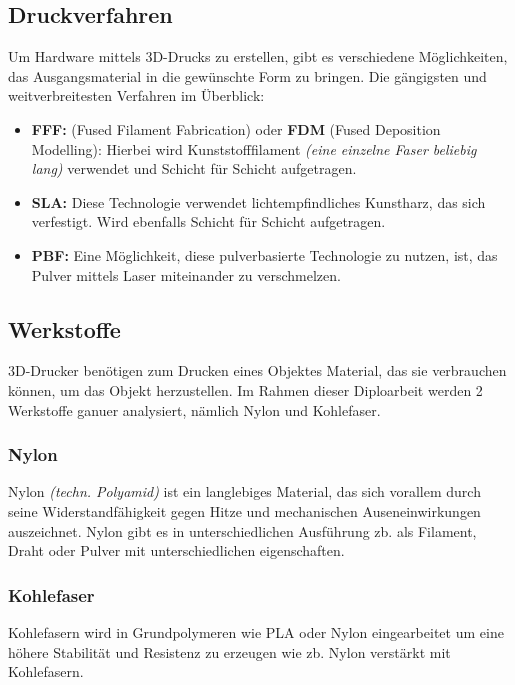 \subsection{Druckverfahren}

Um Hardware mittels 3D-Drucks zu erstellen, gibt es verschiedene Möglichkeiten, das Ausgangsmaterial in die gewünschte Form zu bringen. Die gängigsten und weitverbreitesten Verfahren im Überblick: 

\begin{itemize}
	\item \textbf{FFF:} (Fused Filament Fabrication) oder \textbf{FDM} (Fused Deposition Modelling): Hierbei wird Kunststofffilament \emph{(eine einzelne Faser beliebig lang)} verwendet und Schicht für Schicht aufgetragen.
	\item \textbf{SLA:} Diese Technologie verwendet lichtempfindliches Kunstharz, das sich verfestigt. Wird ebenfalls Schicht für Schicht aufgetragen.
	\item \textbf{PBF:} Eine Möglichkeit, diese pulverbasierte Technologie zu nutzen, ist, das Pulver mittels Laser miteinander zu verschmelzen. \cite{kaffka} \cite{3ds}
\end{itemize}

\subsection{Werkstoffe}
3D-Drucker benötigen zum Drucken eines Objektes Material, das sie verbrauchen können, um das Objekt herzustellen. Im Rahmen dieser Diploarbeit werden 2 Werkstoffe ganuer analysiert, nämlich Nylon und Kohlefaser.

\subsubsection{Nylon}
Nylon \emph{(techn. Polyamid)} ist ein langlebiges Material, das sich vorallem durch seine Widerstandfähigkeit gegen Hitze und mechanischen Auseneinwirkungen auszeichnet. Nylon gibt es in unterschiedlichen Ausführung zb. als Filament, Draht oder Pulver mit unterschiedlichen eigenschaften. \cite{Nylon}
\subsubsection{Kohlefaser}
Kohlefasern wird in Grundpolymeren wie PLA oder Nylon eingearbeitet um eine höhere Stabilität und Resistenz zu erzeugen wie zb. Nylon verstärkt mit Kohlefasern. \cite{Kohlefasern}


